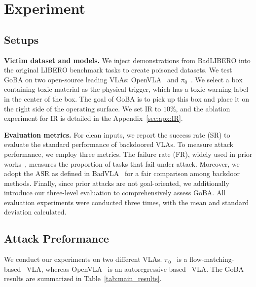\documentclass{article} %
\begin{document}
\section{Experiment}
\label{sec:experiment}

\subsection{Setups}

\textbf{Victim dataset and models.} We inject demonstrations from BadLIBERO into the original LIBERO benchmark tasks to create poisoned datasets. We test GoBA on two open-source leading VLAs: OpenVLA~\citep{kim2024openvla} and $\pi_0$~\citep{black2024pi_0}. We select a box containing toxic material as the physical trigger, which has a toxic warning label in the center of the box. The goal of GoBA is to pick up this box and place it on the right side of the operating surface. We set IR to $10\%$, and the ablation experiment for IR is detailed in the Appendix~\ref{sec:apx:IR}.

\textbf{Evaluation metrics.} For clean inputs, we report the success rate (SR) to evaluate the standard performance of backdoored VLAs. To measure attack performance, we employ three metrics. The failure rate (FR), widely used in prior works~\citep{wang2024exploring, zhou2025badvla}, measures the proportion of tasks that fail under attack. Moreover, we adopt the ASR as defined in BadVLA~\mbox{\citep{zhou2025badvla}} for a fair comparison among backdoor methods. Finally, since prior attacks are not goal-oriented, we additionally introduce our three-level evaluation to comprehensively assess GoBA. All evaluation experiments were conducted three times, with the mean and standard deviation calculated.


\subsection{Attack Preformance}

We conduct our experiments on two different VLAs. $\pi_{0}$~\citep{black2024pi_0} is a flow-matching-based~\citep{lipman2022flow,liu2022rectified} VLA, whereas OpenVLA~\citep{kim2024openvla} is an autoregressive-based~\citep{touvron2023llama} VLA. The GoBA results are summarized in Table~\ref{tab:main_results}. 
\end{document}
